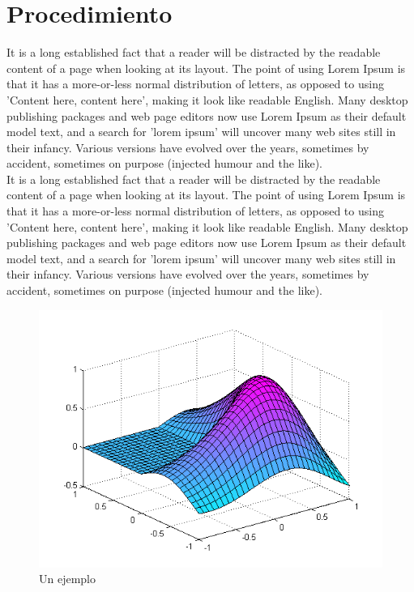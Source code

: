 \documentclass[11pt, spanish]{article}
\begin{document}
\section{Procedimiento}

It is a long established fact that a reader will be distracted by the readable content of a page when looking at its layout. The point of using Lorem Ipsum is that it has a more-or-less normal distribution of letters, as opposed to using 'Content here, content here', making it look like readable English. Many desktop publishing packages and web page editors now use Lorem Ipsum as their default model text, and a search for 'lorem ipsum' will uncover many web sites still in their infancy. Various versions have evolved over the years, sometimes by accident, sometimes on purpose (injected humour and the like).\\

It is a long established fact that a reader will be distracted by the readable content of a page when looking at its layout. The point of using Lorem Ipsum is that it has a more-or-less normal distribution of letters, as opposed to using 'Content here, content here', making it look like readable English. Many desktop publishing packages and web page editors now use Lorem Ipsum as their default model text, and a search for 'lorem ipsum' will uncover many web sites still in their infancy. Various versions have evolved over the years, sometimes by accident, sometimes on purpose (injected humour and the like).

\begin{figure}[htbp]
\centering
	\includegraphics[scale=0.8]{data/img/plot1}
	\caption{Un ejemplo}
\end{figure}
\end{document}
